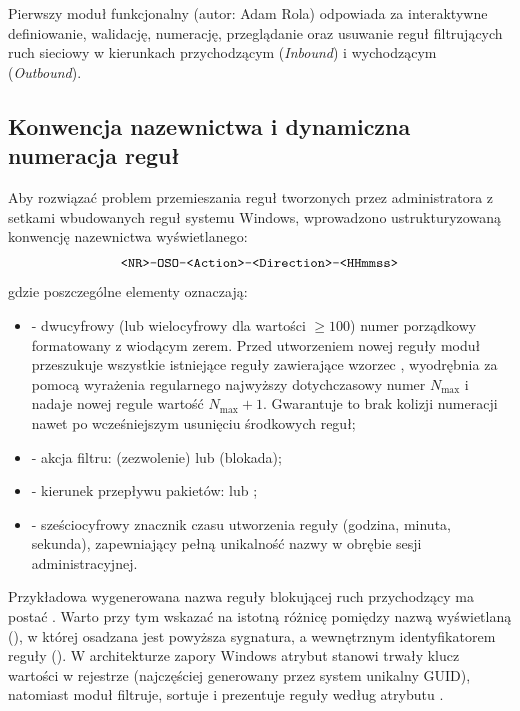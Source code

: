 Pierwszy moduł funkcjonalny (autor: Adam Rola) odpowiada za interaktywne definiowanie, walidację, numerację, przeglądanie oraz usuwanie reguł filtrujących ruch sieciowy w kierunkach przychodzącym (\textit{Inbound}) i wychodzącym (\textit{Outbound}).

\subsection{Konwencja nazewnictwa i dynamiczna numeracja reguł}\label{subsec:schemat-prefiks-oso}

Aby rozwiązać problem przemieszania reguł tworzonych przez administratora z setkami wbudowanych reguł systemu Windows, wprowadzono ustrukturyzowaną konwencję nazewnictwa wyświetlanego:
\begin{equation}\label{eq:konwencja-nazewnictwa}
    \texttt{<NR>}\text{\texttt{-OSO-}}\texttt{<Action>}\text{\texttt{-}}\texttt{<Direction>}\text{\texttt{-}}\texttt{<HHmmss>}
\end{equation}
gdzie poszczególne elementy oznaczają:
\begin{itemize}
    \item {} - dwucyfrowy (lub wielocyfrowy dla wartości $\ge 100$) numer porządkowy formatowany z wiodącym zerem. Przed utworzeniem nowej reguły moduł przeszukuje wszystkie istniejące reguły zawierające wzorzec , wyodrębnia za pomocą wyrażenia regularnego  najwyższy dotychczasowy numer $N_{\max}$ i nadaje nowej regule wartość $N_{\max} + 1$. Gwarantuje to brak kolizji numeracji nawet po wcześniejszym usunięciu środkowych reguł;
    \item {} - akcja filtru:  (zezwolenie) lub  (blokada);
    \item {} - kierunek przepływu pakietów:  lub ;
    \item {} - sześciocyfrowy znacznik czasu utworzenia reguły (godzina, minuta, sekunda), zapewniający pełną unikalność nazwy w obrębie sesji administracyjnej.
\end{itemize}

Przykładowa wygenerowana nazwa reguły blokującej ruch przychodzący ma postać . Warto przy tym wskazać na istotną różnicę pomiędzy nazwą wyświetlaną (), w której osadzana jest powyższa sygnatura, a wewnętrznym identyfikatorem reguły (). W architekturze zapory Windows atrybut  stanowi trwały klucz wartości w rejestrze (najczęściej generowany przez system unikalny GUID), natomiast moduł filtruje, sortuje i prezentuje reguły według atrybutu .

